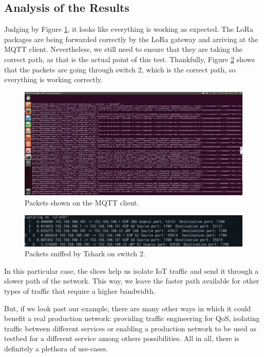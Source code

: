 \subsection{Analysis of the Results}
Judging by Figure \ref{fig:mosquitto}, it looks like everything is working as expected. The LoRa packages are being forwarded correctly by the LoRa gateway and arriving at the MQTT client. Nevertheless, we still need to ensure that they are taking the correct path, as that is the actual point of this test. Thankfully, Figure \ref{fig:LoRa_tshark} shows that the packets are going through switch 2, which is the correct path, so everything is working correctly.

\begin{figure}
  \centering
  \includegraphics[width=\linewidth]{imagenes/Testing/mosquitto_packets.png}
  \caption{Packets shown on the MQTT client.}
  \label{fig:mosquitto}
\end{figure}

\begin{figure}
  \centering
  \includegraphics[width=\linewidth]{imagenes/Testing/tshark-LoRa.png}
  \caption{Packets sniffed by Tshark on switch 2.}
  \label{fig:LoRa_tshark}
\end{figure}


In this particular case, the slices help us isolate IoT traffic and send it through a slower path of the network. This way, we leave the faster path available for other types of traffic that require a higher bandwidth.

But, if we look past our example, there are many other ways in which it could benefit a real production network: providing traffic engineering for QoS, isolating traffic between different services or enabling a production network to be used as testbed for a different service among others possibilities. All in all, there is definitely a plethora of use-cases. 
